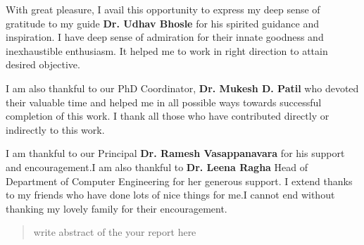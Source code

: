 %
%
%
%
%
%
%



\begin{acknowledgments}

With great pleasure, I avail this opportunity to express my deep
sense of gratitude to my guide \textbf{Dr. Udhav Bhosle} for his spirited guidance
and inspiration. I have deep sense of admiration for their innate
goodness and inexhaustible enthusiasm. It helped me to work in right
direction to attain desired objective.

I am also thankful to our PhD Coordinator,\textbf{ Dr. Mukesh D. Patil} who devoted their
valuable time and helped me in all possible ways towards successful
completion of this work. I thank all those who have contributed
directly or indirectly to this work.

I am thankful to our Principal \textbf{Dr. Ramesh Vasappanavara} for his support and
encouragement.I am also thankful to \textbf{Dr. Leena Ragha} Head of Department of Computer Engineering for her generous support. 
I extend thanks to my friends who have done lots of
nice things for me.I cannot end without thanking my lovely family
for their encouragement.
\end{acknowledgments}

\begin{abstract}

write abstract of the your report here


\end{abstract}

